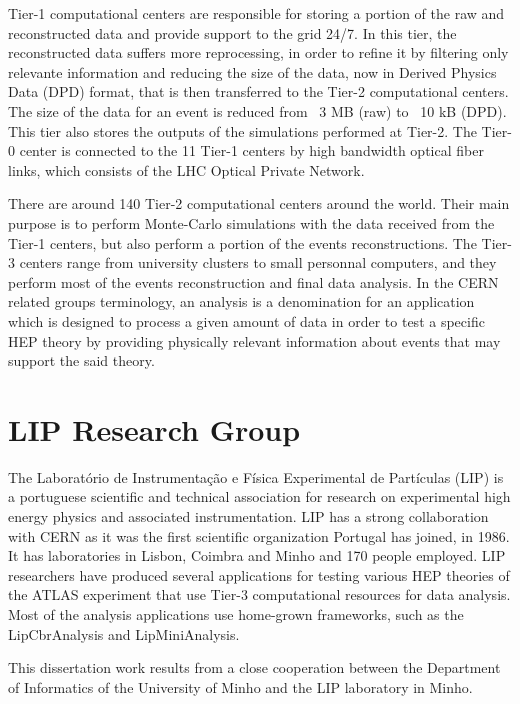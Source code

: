 Tier-1 computational centers are responsible for storing a portion of the raw and reconstructed data and provide support to the grid 24/7. In this tier, the reconstructed data suffers more reprocessing, in order to refine it by filtering only relevante information and reducing the size of the data, now in Derived Physics Data (DPD) format, that is then transferred to the Tier-2 computational centers. The size of the data for an event is reduced from ~3 MB (raw) to ~10 kB (DPD). This tier also stores the outputs of the simulations performed at Tier-2. The Tier-0 center is connected to the 11 Tier-1 centers by high bandwidth optical fiber links, which consists of the LHC Optical Private Network.

There are around 140 Tier-2 computational centers around the world. Their main purpose is to perform Monte-Carlo simulations with the data received from the Tier-1 centers, but also perform a portion of the events reconstructions. The Tier-3 centers range from university clusters to small personnal computers, and they perform most of the events reconstruction and final data analysis. In the CERN related groups terminology, an analysis is a denomination for an application which is designed to process a given amount of data in order to test a specific HEP theory by providing physically relevant information about events that may support the said theory.

\section{LIP Research Group}
\label{LIP}

The Laboratório de Instrumentação e Física Experimental de Partículas (LIP) \cite{LIP} is a portuguese scientific and technical association for research on experimental high energy physics and associated instrumentation. LIP has a strong collaboration with CERN as it was the first scientific organization Portugal has joined, in 1986. It has laboratories in Lisbon, Coimbra and Minho and 170 people employed. LIP researchers have produced several applications for testing various HEP theories of the ATLAS experiment that use Tier-3 computational resources for data analysis. Most of the analysis applications use home-grown frameworks, such as the LipCbrAnalysis and LipMiniAnalysis.

This dissertation work results from a close cooperation between the Department of Informatics of the University of Minho and the LIP laboratory in Minho.

